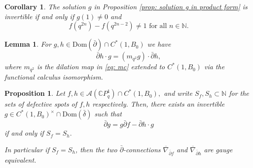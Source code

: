 \documentclass[10pt,a4paper]{amsart}
\newtheorem{proposition}{Proposition}
\newtheorem{corollary}{Corollary}
\newtheorem{lemma}{Lemma}
\def\A{\mathcal{A}}
\def\C{{\mathbb C}}
\def\Dom{{\mathrm {Dom}}}
\def\N{{\mathbb N}}
\def\db{\bar{\delta}}
\def\pb{\bar{\partial}}
\begin{document}
\begin{corollary}\label{coro: g invertible}
   The solution $g$ in Proposition \ref{prop: solution g in product form} is invertible if and only if $g(1)\neq 0$ and
    \begin{equation}\label{eq: defective spot of f}
    f(q^{2n}) - f(q^{2n - 2}) \neq 1\text{ for all }n \in \N.\end{equation}
\end{corollary}

\begin{lemma} \label{lemma: commuting partials in CB0}
    For $g, h \in \Dom(\pb)\cap C^*(1, B_0)$ we have  
    \begin{equation}\label{eq: commuting partials in CB0}
    \pb h \cdot g = (m_{q^2}g) \cdot \pb h,
    \end{equation}
    where $m_{q^2}$ is the dilation map in \eqref{eq: mc} extended to $C^*(1, B_0)$ via the functional calculus isomorphism.
\end{lemma}

\begin{proposition}\label{prop: gauge equivalent between connections}
    Let $f, h \in \A(\C P^1_q)\cap C^*(1, B_0),$ and write $S_f, S_h \subset \N$ for the sets of defective spots of $f, h$ respectively. Then, there exists an invertible $g \in C^*(1, B_0)^{\times}\cap \Dom(\db)$ such that \begin{equation}\label{eq: gauge equivalence in B0}
    \pb g = g \pb f -\pb h \cdot g\end{equation} if and only if $S_f = S_h.$

    In particular if $S_f = S_h$, then the two $\pb$-connections $\overline{\nabla}_{\pb f}$ and $\overline{\nabla}_{\pb h}$  are gauge equivalent.
\end{proposition}
\end{document}
